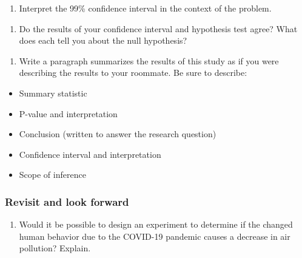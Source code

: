 \documentclass[
]{report}
\providecommand{\tightlist}{%
  \setlength{\itemsep}{0pt}\setlength{\parskip}{0pt}}
\begin{document}
\begin{enumerate}
\def\labelenumi{\arabic{enumi}.}
\setcounter{enumi}{21}
\tightlist
\item
  Interpret the 99\% confidence interval in the context of the problem.
\end{enumerate}

\vspace{1in}

\begin{enumerate}
\def\labelenumi{\arabic{enumi}.}
\setcounter{enumi}{22}
\tightlist
\item
  Do the results of your confidence interval and hypothesis test agree? What does each tell you about the null hypothesis?
\end{enumerate}

\vspace{.7in}

\newpage

\begin{enumerate}
\def\labelenumi{\arabic{enumi}.}
\setcounter{enumi}{23}
\tightlist
\item
  Write a paragraph summarizes the results of this study as if you were describing the results to your roommate. Be sure to describe:
\end{enumerate}

\begin{itemize}
\item
  Summary statistic
\item
  P-value and interpretation
\item
  Conclusion (written to answer the research question)
\item
  Confidence interval and interpretation
\item
  Scope of inference
\end{itemize}

\vspace{2.6in}

\hypertarget{revisit-and-look-forward}{%
\subsubsection*{Revisit and look forward}\label{revisit-and-look-forward}}

\begin{enumerate}
\def\labelenumi{\arabic{enumi}.}
\setcounter{enumi}{24}
\tightlist
\item
  Would it be possible to design an experiment to determine if the changed human behavior due to the COVID-19 pandemic causes a decrease in air pollution? Explain.
  \vspace{0.6in}
\end{enumerate}
\end{document}
